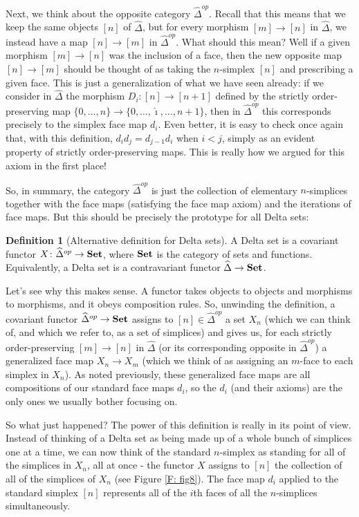 \documentclass[12pt]{article}
\theoremstyle{plain}
\theoremstyle{definition}
\newtheorem{definition}[theorem]{Definition}
\theoremstyle{remark}
\newcommand{\Set}{\text{\textbf{Set}}}
\begin{document}
Next, we think about the opposite category $\widehat \Delta^{op}$. Recall that this means that we keep the same objects $[n]$ of $\widehat \Delta$, but for every morphism $[m]\to [n]$ in $\widehat \Delta$, we instead have a map $[n]\to [m]$ in $\widehat \Delta^{op}$. What should this mean? Well if a given morphism $[m]\to[n]$ was the inclusion of a face, then the new opposite map $[n]\to[m]$ should be thought of as taking  the $n$-simplex $[n]$ and prescribing a given face. This is just a generalization of what we have seen already: if we consider in $\widehat \Delta$ the morphism $D_i\colon[n]\to [n+1]$ defined by the strictly order-preserving map $\{0,\ldots, n\}\to \{0,\ldots, \hat \imath,\ldots, n+1\}$, then in $\widehat\Delta^{op}$ this corresponds precisely to the simplex face map $d_i$. Even better, it is easy to check once again that, with this definition, $d_id_j=d_{j-1}d_i$ when $i<j$, simply as an evident property of strictly order-preserving maps. This is really how we argued for this axiom in the first place! 


So, in summary, the category $\widehat \Delta^{op}$ is just the collection of elementary $n$-simplices together with the face maps (satisfying the face map axiom) and the iterations of face maps. But this should be precisely the prototype for all Delta sets:

\begin{definition}[Alternative definition for Delta sets]
A Delta set is a covariant functor $X\colon\widehat \Delta^{op}\to \Set$, where $\Set$ is the category of sets and functions. Equivalently, a Delta set is a contravariant functor $\widehat \Delta \to \Set$. 
\end{definition}

Let's see why this makes sense. A functor takes objects to objects and morphisms to morphisms, and it obeys composition rules. So, unwinding the definition, a covariant functor $\widehat \Delta^{op}\to \Set$ assigns to $[n]\in \widehat \Delta^{op}$  a set $X_n$ (which we can think of, and which we refer to, as a set of simplices) and gives us, for each strictly order-preserving $[m]\to [n]$ in $\widehat \Delta$ (or its corresponding opposite in $\widehat \Delta^{op}$) a generalized face map $X_n\to X_m$ (which we think of as assigning an $m$-face to each simplex in $X_n$). As noted previously, these generalized face maps are all compositions of our standard face maps $d_i$, so the $d_i$ (and their axioms) are the only ones we usually bother focusing on.

So what just happened? The power of this definition is really in its point of view. Instead of thinking of a Delta set as being made up of a whole bunch of simplices one at a time, we can now think of the standard $n$-simplex as standing for all of the simplices in $X_n$, all at once - the functor $X$ assigns to $[n]$ the collection of all of the simplices of $X_n$ (see Figure \ref{F: fig8}). The face map $d_i$ applied to the standard simplex $[n]$ represents all of the $i$th faces of all the $n$-simplices simultaneously. 
\end{document}
